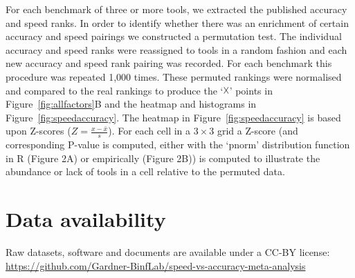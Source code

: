 \documentclass[fleqn,10pt]{SelfArx} %
\begin{document}
%
%

For each benchmark of three or more tools, we extracted the published
accuracy and speed ranks. In order to identify whether there was an
enrichment of certain accuracy and speed pairings we constructed a
permutation test. The individual accuracy and speed ranks were
reassigned to tools in a random fashion and each new accuracy and
speed rank pairing was recorded. For each benchmark this procedure was
repeated 1,000 times. These permuted rankings were normalised and
compared to the real rankings to produce the ‘$\vartimes$’ points in
Figure~\ref{fig:allfactors}B and the heatmap and histograms in
Figure~\ref{fig:speedaccuracy}. The heatmap in
Figure~\ref{fig:speedaccuracy} is based upon Z-scores
($Z=\frac{x-\bar{x}}{s}$). For each cell in a $3\times 3$ grid
a Z-score (and corresponding P-value is computed, either with the `pnorm' distribution function in R (Figure 2A) or empirically (Figure 2B)) is computed to illustrate the abundance or lack of tools in
a cell relative to the permuted data.

\section*{Data availability}
Raw datasets, software and documents are available under a CC-BY license:\\
\fussy
\url{https://github.com/Gardner-BinfLab/speed-vs-accuracy-meta-analysis}
\sloppy
\end{document}
